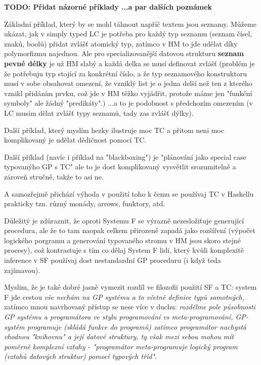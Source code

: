 \documentclass[11pt]{article}
\newcommand{\red}[1]{{\color{red} #1}}
\begin{document}
\begin{article}

\red{\textbf{TODO: Přidat názorné příklady ...a par dalších poznámek}

Základní příklad, který by se mohl táhnout napříč textem jsou seznamy. Můžeme ukázat, jak v simply typed LC je potřeba pro každý typ seznamu (seznam čísel, znaků, boolů) přidat zvlášť atomický typ, zatímco v HM to jde udělat díky polymorfizmu najednou. Ale pro specializovanější datovou strukturu \textbf{seznam pevné délky} je už HM slabý a každá delka se musí definovat zvlášť (problém je že potřebuju typ stojící za konkrétní číslo, a že typ seznamového konstruktoru musí v sobe obsahovat omezení, že vzniklý list je o jedna delší než ten z kterého vznikl přidáním prvku, což jde v HM těžko vyjádřit, protože máme jen "funkční symboly" ale žádný "predikáty".) ...a to je podobnost s předchozím omezením (v LC musim dělat zvlášť typy seznamů, tady zas zvlášť dýlky). 

Další příklad, který myslím hezky ilustruje moc TC a přitom neni moc komplikovaný je udělat dědičnost pomocí TC.

Další příklad (navíc i příklad na "blackboxing") je "plánování jako special case typovanýho GP s TC" ale to je dost komplikovaný vysvětlit srozumitelně a zároveň stručně, takže to asi ne.

A samozřejmě přichází výhoda v použití toho k čemu se používaj TC v Haskellu prakticky tzn. různý monády, arrows, funktory, atd. 

Důležitý je zdůraznit, že oproti Systemu F se výrazně nezesložiťuje generující procedura, ale že to tam naopak celkem přirozeně zapadá jako rozšíření (výpočet logického porgramu a generování typovaného stromu v HM jsou skoro stejné procesy), což kontrastuje s tím co dělaj System F lidi, který kvůli komplexitě inference v SF používaj dost nestandardní GP proceduru (i když teda zajímavou). 

Myslim, že je také dobré jasně vymezit rozdíl ve filozofii použití SF a TC: system F jde cestou \textit{vše nechám na GP systému a to včetně definice typů samotných}, zatímco mnou navrhovaný přístup se nese více v duchu: \textit{rozdělme pole působnosti GP systému a programátora ve stylu programování vs meta-programování, GP-systém programuje (skládá funkce do programů) zatímco programátor nachystá vhodnou "knihovnu" a její datové struktury, ty však mezi sebou mohou mít poměrně komplexní vztahy - "programátor meta-programuje logický program (vztahů datových struktur) pomocí typových tříd"}.
}


\end{article}
\end{document}
